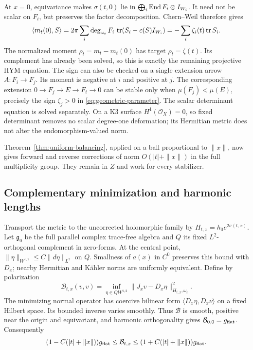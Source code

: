 At $x=0$, equivariance makes $\sigma(t,0)$ lie in
$\bigoplus_i\operatorname{End} F_i\otimes I_{W_i}$. It need not be scalar on $F_i$,
but preserves the factor decomposition. Chern--Weil therefore gives
\[
 \langle m_t(0),S\rangle
 =2\pi\sum_i\deg_{\omega_t}F_i\,
       \operatorname{tr}(S_i-c(S)I_{W_i})
 =-\sum_i\zeta_i(t)\operatorname{tr} S_i.
\]
The normalized moment $\rho_t=m_t-m_t(0)$ has target
$\rho_t=\zeta(t)$. Its complement has already been solved, so this
is exactly the remaining projective HYM equation.
The sign can also be checked on a single extension arrow
$A:F_i\to F_j$. Its moment is negative at $i$ and positive at $j$.
The corresponding extension $0\to F_j\to E\to F_i\to0$
can be stable only when $\mu(F_j)<\mu(E)$, precisely the sign
$\zeta_j>0$ in \eqref{eq:geometric-parameter}.
The scalar determinant equation is solved separately.
On a K3 surface $H^1(\mathcal O_X)=0$, so fixed determinant removes
no scalar degree-one deformation; its Hermitian metric does not
alter the endomorphism-valued norm.

Theorem~\ref{thm:uniform-balancing}, applied on a ball proportional
to $\|x\|$, now gives forward and reverse corrections of norm
$O(|t|+\|x\|)$ in the full multiplicity group.
They remain in $Z$ and work for every stabilizer.

\subsection{Complementary minimization and harmonic lengths}
Transport the metric to the uncorrected holomorphic family by
$H_{t,x}=h_0e^{2\sigma(t,x)}$.
Let $\mathfrak g_0$ be the full parallel complex trace-free algebra
and $Q$ its fixed $L^2$-orthogonal complement in zero-forms.
At the central point,
$\|\eta\|_{W^{1,2}}\le C\|d\eta\|_{L^2}$ on $Q$.
Smallness of $a(x)$ in $C^0$ preserves this bound with $D_x$;
nearby Hermitian and K\"ahler norms are uniformly equivalent.
Define by polarization
\begin{equation}\label{eq:complementary-minimum}
 \mathcal B_{t,x}(v,v)
 =\inf_{\eta\in QW^{1,2}}
        \|J_xv-D_x\eta\|_{H_{t,x},\omega_t}^2.
\end{equation}
The minimizing normal operator has coercive bilinear form
$\langle D_x\eta,D_x\nu\rangle$ on a fixed Hilbert space.
Its bounded inverse varies smoothly. Thus $\mathcal B$ is smooth,
positive near the origin and equivariant, and harmonic orthogonality
gives $\mathcal B_{0,0}=g_{\rm flat}$. Consequently
\begin{equation}\label{eq:complementary-metric}
 (1-C(|t|+\|x\|))g_{\rm flat}
 \le\mathcal B_{t,x}
 \le(1+C(|t|+\|x\|))g_{\rm flat}.
\end{equation}

